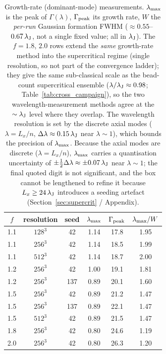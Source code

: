 \documentclass[usenatbib,twoside,twocolumn]{mnras}
\begin{document}
\begin{table}
\caption{Growth-rate (dominant-mode) measurements. $\lambda_{\rm max}$ is the peak of $\Gamma(\lambda)$, $\Gamma_{\rm peak}$ its growth rate, $W$ the \emph{per-run} Gaussian formation FWHM ($\approx0.55$--$0.67\,\lambda_{\rm J}$, not a single fixed value; all in $\lambda_{\rm J}$). The $f=1.8$, $2.0$ rows extend the \emph{same} growth-rate method into the supercritical regime (single resolution, so not part of the convergence ladder); they give the same sub-classical scale as the bead-count supercritical ensemble ($\lambda/\lambda_{\rm J}\approx0.98$; Table~\ref{tab:cross_campaign}), so the two wavelength-measurement methods agree at the $\sim\lambda_{\rm J}$ level where they overlap. The wavelength resolution is set by the discrete axial modes ($\lambda=L_x/n$, $\Delta\lambda\approx0.15\,\lambda_{\rm J}$ near $\lambda\sim1$), which bounds the precision of $\lambda_{\rm max}$. Because the axial modes are discrete ($\lambda=L_x/n$), $\lambda_{\rm max}$ carries a quantisation uncertainty of $\pm\tfrac12\Delta\lambda\approx\pm0.07\,\lambda_{\rm J}$ near $\lambda\sim1$; the final quoted digit is not significant, and the box cannot be lengthened to refine it because $L_x\geq24\,\lambda_{\rm J}$ introduces a seeding artefact (Section~\ref{sec:supercrit} / Appendix).}
\label{tab:wave}
\footnotesize
\setlength{\tabcolsep}{4pt}
\begin{tabular}{cccccc}
\toprule
$f$ & resolution & seed & $\lambda_{\rm max}$ & $\Gamma_{\rm peak}$ & $\lambda_{\rm max}/W$ \\
\midrule
1.1 & $128^3$ & 42  & 1.14 & 17.8 & 1.95 \\
1.1 & $256^3$ & 42  & 1.14 & 18.5 & 1.99 \\
1.1 & $512^3$ & 42  & 1.14 & 18.7 & 2.00 \\
1.2 & $256^3$ & 42  & 1.00 & 19.1 & 1.81 \\
1.2 & $256^3$ & 137 & 0.89 & 20.1 & 1.60 \\
1.5 & $256^3$ & 42  & 0.89 & 21.2 & 1.47 \\
1.5 & $256^3$ & 137 & 0.89 & 22.1 & 1.47 \\
1.5 & $512^3$ & 42  & 0.89 & 21.5 & 1.47 \\
1.8 & $256^3$ & 42  & 0.80 & 24.6 & 1.19 \\
2.0 & $256^3$ & 42  & 0.80 & 26.3 & 1.20 \\
\bottomrule
\end{tabular}
\end{table}
\end{document}
